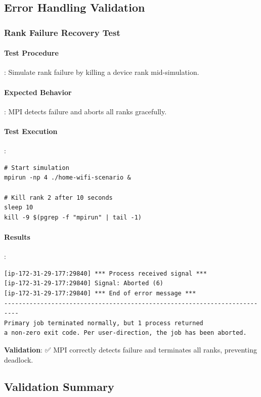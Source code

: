 \subsection{Error Handling Validation}

\subsubsection{Rank Failure Recovery Test}

\paragraph{Test Procedure}:
Simulate rank failure by killing a device rank mid-simulation.

\paragraph{Expected Behavior}:
MPI detects failure and aborts all ranks gracefully.

\paragraph{Test Execution}:
\begin{lstlisting}[style=bash]
# Start simulation
mpirun -np 4 ./home-wifi-scenario &

# Kill rank 2 after 10 seconds
sleep 10
kill -9 $(pgrep -f "mpirun" | tail -1)
\end{lstlisting}

\paragraph{Results}:
\begin{verbatim}
[ip-172-31-29-177:29840] *** Process received signal ***
[ip-172-31-29-177:29840] Signal: Aborted (6)
[ip-172-31-29-177:29840] *** End of error message ***
--------------------------------------------------------------------------
Primary job terminated normally, but 1 process returned
a non-zero exit code. Per user-direction, the job has been aborted.
\end{verbatim}

\textbf{Validation}: ✅ MPI correctly detects failure and terminates all ranks, preventing deadlock.

\subsection{Validation Summary}

